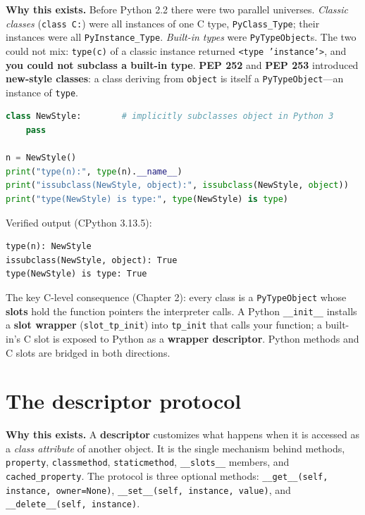 \textbf{Why this exists.} Before Python 2.2 there were two parallel universes. \emph{Classic
classes} (\texttt{class C:}) were all instances of one C type, \texttt{PyClass\_Type}; their
instances were all \texttt{PyInstance\_Type}. \emph{Built-in types} were
\texttt{PyTypeObject}s. The two could not mix: \texttt{type(c)} of a classic instance returned
\texttt{<type 'instance'>}, and \textbf{you could not subclass a built-in type}. \textbf{PEP
252} and \textbf{PEP 253} introduced \textbf{new-style classes}: a class deriving from
\texttt{object} is itself a \texttt{PyTypeObject}---an instance of \texttt{type}.

\begin{lstlisting}[language=Python, caption={In Python 3 every class is new-style; type(instance) IS the class.}]
class NewStyle:        # implicitly subclasses object in Python 3
    pass

n = NewStyle()
print("type(n):", type(n).__name__)
print("issubclass(NewStyle, object):", issubclass(NewStyle, object))
print("type(NewStyle) is type:", type(NewStyle) is type)
\end{lstlisting}

Verified output (CPython 3.13.5):

\begin{lstlisting}[caption={Output}]
type(n): NewStyle
issubclass(NewStyle, object): True
type(NewStyle) is type: True
\end{lstlisting}

The key C-level consequence (Chapter 2): every class is a \texttt{PyTypeObject} whose
\textbf{slots} hold the function pointers the interpreter calls. A Python \texttt{\_\_init\_\_}
installs a \textbf{slot wrapper} (\texttt{slot\_tp\_init}) into \texttt{tp\_init} that calls
your function; a built-in's C slot is exposed to Python as a \textbf{wrapper descriptor}. Python
methods and C slots are bridged in both directions.

\section{The descriptor protocol}

\textbf{Why this exists.} A \textbf{descriptor} customizes what happens when it is accessed as a
\emph{class attribute} of another object. It is the single mechanism behind methods,
\texttt{property}, \texttt{classmethod}, \texttt{staticmethod}, \texttt{\_\_slots\_\_} members,
and \texttt{cached\_property}. The protocol is three optional methods: \texttt{\_\_get\_\_(self,
instance, owner=None)}, \texttt{\_\_set\_\_(self, instance, value)}, and
\texttt{\_\_delete\_\_(self, instance)}.

